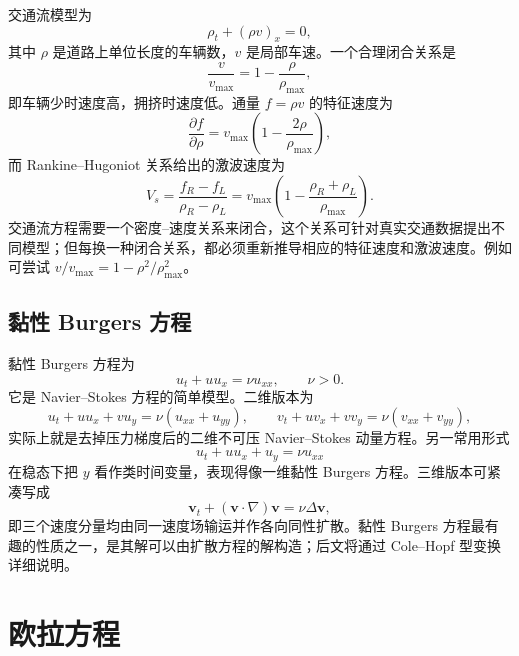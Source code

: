 \documentclass[11pt,a4paper,openany,fontset=none]{ctexbook}
\begin{document}
交通流模型为
\begin{equation}
 \rho_t+(\rho v)_x=0, \tag{2.14.1}
\end{equation}
其中 $\rho$ 是道路上单位长度的车辆数，$v$ 是局部车速。一个合理闭合关系是
\begin{equation}
 \frac{v}{v_{\max}}=1-\frac{\rho}{\rho_{\max}}, \tag{2.14.2}
\end{equation}
即车辆少时速度高，拥挤时速度低。通量 $f=\rho v$ 的特征速度为
\begin{equation}
 \frac{\partial f}{\partial\rho}=v_{\max}\left(1-\frac{2\rho}{\rho_{\max}}\right), \tag{2.14.3}
\end{equation}
而 Rankine--Hugoniot 关系给出的激波速度为
\begin{equation}
 V_s=\frac{f_R-f_L}{\rho_R-\rho_L}
 =v_{\max}\left(1-\frac{\rho_R+\rho_L}{\rho_{\max}}\right). \tag{2.14.4}
\end{equation}
交通流方程需要一个密度--速度关系来闭合，这个关系可针对真实交通数据提出不同模型；但每换一种闭合关系，都必须重新推导相应的特征速度和激波速度。例如可尝试 $v/v_{\max}=1-\rho^2/\rho_{\max}^2$。

\section{黏性 Burgers 方程}

黏性 Burgers 方程为
\begin{equation}
 u_t+u u_x=\nu u_{xx},\qquad \nu>0. \tag{2.15.1}
\end{equation}
它是 Navier--Stokes 方程的简单模型。二维版本为
\begin{equation}
 u_t+u u_x+v u_y=\nu(u_{xx}+u_{yy}),\qquad
 v_t+u v_x+v v_y=\nu(v_{xx}+v_{yy}), \tag{2.15.2--3}
\end{equation}
实际上就是去掉压力梯度后的二维不可压 Navier--Stokes 动量方程。另一常用形式
\begin{equation}
 u_t+u u_x+u_y=\nu u_{xx} \tag{2.15.4}
\end{equation}
在稳态下把 $y$ 看作类时间变量，表现得像一维黏性 Burgers 方程。三维版本可紧凑写成
\begin{equation}
 \bm v_t+(\bm v\cdot\nabla)\bm v=\nu\Delta\bm v, \tag{2.15.5--7}
\end{equation}
即三个速度分量均由同一速度场输运并作各向同性扩散。黏性 Burgers 方程最有趣的性质之一，是其解可以由扩散方程的解构造；后文将通过 Cole--Hopf 型变换详细说明。


\chapter{欧拉方程}
\end{document}
